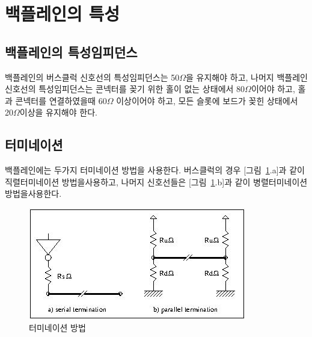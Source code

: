 \section{백플레인의 특성}
\subsection{백플레인의 특성임피던스}
백플레인의 버스클럭 신호선의 특성임피던스는 50$\Omega$을 유지해야 하고,
나머지 백플레인 신호선의 특성임피던스는 콘넥터를 꽂기 위한 홀이 없는
상태에서 80$\Omega$이어야 하고,
홀과 콘넥터를 연결하였을때 60$\Omega$ 이상이어야 하고,
모든 슬롯에 보드가 꽂힌 상태에서 20$\Omega$이상을 유지해야 한다.
\subsection{터미네이션}
백플레인에는 두가지 터미네이션 방법을 사용한다.
버스클럭의 경우 [그림~\ref{figure:terminator}.a]과 같이 직렬터미네이션 방법을사용하고,
나머지 신호선들은 [그림~\ref{figure:terminator}.b]과 같이 병렬터미네이션 방법을사용한다.
\begin{figure}[htb]
    \centerline{\includegraphics{ch7/FIG/terminator.jpg}}
   \caption{터미네이션 방법}\label{figure:terminator}
\end{figure}
%
